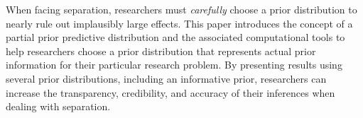 \documentclass[12pt]{article}
\begin{document}
When facing separation, researchers must \emph{carefully} choose a prior distribution to nearly rule out implausibly large effects. 
This paper introduces the concept of a partial prior predictive distribution and the associated computational tools to help researchers choose a prior distribution that represents actual prior information for their particular research problem. 
By presenting results using several prior distributions, including an informative prior, researchers can increase the transparency, credibility, and accuracy of their inferences when dealing with separation.

\singlespace

%

\end{document}
